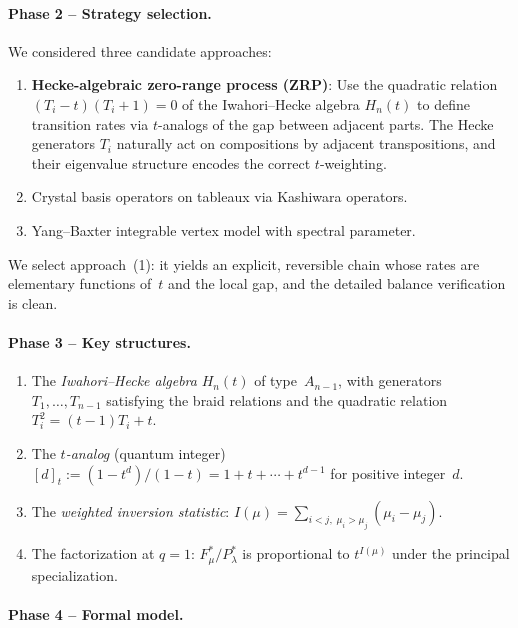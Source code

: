 \paragraph{Phase 2 -- Strategy selection.}
We considered three candidate approaches:
\begin{enumerate}
\item \textbf{Hecke-algebraic zero-range process (ZRP)}: Use the quadratic
  relation $(T_i - t)(T_i + 1) = 0$ of the Iwahori--Hecke algebra $H_n(t)$
  to define transition rates via $t$-analogs of the gap between adjacent parts.
  The Hecke generators $T_i$ naturally act on compositions by adjacent
  transpositions, and their eigenvalue structure encodes the correct
  $t$-weighting.
\item Crystal basis operators on tableaux via Kashiwara operators.
\item Yang--Baxter integrable vertex model with spectral parameter.
\end{enumerate}
We select approach~(1): it yields an explicit, reversible chain whose
rates are elementary functions of~$t$ and the local gap, and the
detailed balance verification is clean.

\paragraph{Phase 3 -- Key structures.}
\begin{enumerate}
\item The \emph{Iwahori--Hecke algebra} $H_n(t)$ of type~$A_{n-1}$, with
  generators $T_1, \ldots, T_{n-1}$ satisfying the braid relations and
  the quadratic relation $T_i^2 = (t-1)T_i + t$.
\item The \emph{$t$-analog} (quantum integer) $[d]_t := (1 - t^d)/(1-t)
  = 1 + t + \cdots + t^{d-1}$ for positive integer~$d$.
\item The \emph{weighted inversion statistic}:
  $I(\mu) = \sum_{i<j,\; \mu_i > \mu_j} (\mu_i - \mu_j)$.
\item The factorization at $q = 1$: $F^*_\mu / P^*_\lambda$ is
  proportional to $t^{I(\mu)}$ under the principal specialization.
\end{enumerate}

\paragraph{Phase 4 -- Formal model.}

